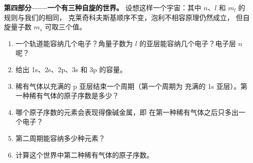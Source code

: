 \begin{problem}
\medskip
\noindent\textbf{第四部分——一个有三种自旋的世界。}
设想这样一个宇宙：其中 $n$、$l$ 和 $m_l$ 的规则与我们的相同，
克莱奇科夫斯基顺序不变，泡利不相容原理仍然成立，
但自旋量子数 $m_s$ 可取三个值。
\begin{enumerate}[resume]
  \item 一个轨道能容纳几个电子？角量子数为
        $l$ 的亚层能容纳几个电子？电子层 $n$ 呢？
  \item 给出 1s、2s、2p、3s 和 3p 的容量。
  \item 稀有气体以充满的 p 亚层结束一个周期（第一个周期为
        充满的 1s 亚层）。第一种稀有气体的原子序数是多少？
  \item 哪个原子序数的元素会表现得像碱金属，即
        在第一种稀有气体之后只多出一个电子？
  \item 第二周期能容纳多少种元素？
  \item 计算这个世界中第二种稀有气体的原子序数。
\end{enumerate}
\end{problem}
